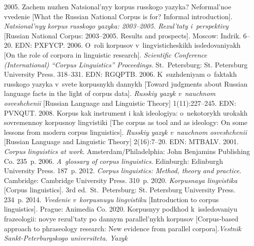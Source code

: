 \begin{multicols}{2}
{\small\frenchspacing
 {%
 \begin{thebibliography}{99} 
 2005. Zachem nuzhen Natsional'nyy kor\-pus russkogo yazyka? 
Neformal'noe vvedenie [What the Russian National Corpus is for? Informal introduction]. 
\textit{Natsional'nyy korpus russkogo yazyka: 2003--2005. Rezul'taty i~perspektivy} [Russian 
National Corpus: 2003--2005. Results and prospects].  Moscow: Indrik. 6--20. EDN: PXFYCP.
 2006. O~roli korpusov v~lingvisticheskikh issledovaniyakh [On the role 
of corpora in linguistic research]. \textit{Scientific Conference (International) ``Corpus Linguistics'' Proceedings}. St.\ 
Petersburg: St. Petersburg University Press. 318--331. EDN: RGQPTB.
\bibitem{3-gon-1}
 2006. K~suzhdeniyam o~faktakh russkogo yazyka v~svete korpusnykh 
dannykh [Toward judgments about Russian language facts in the light of corpus data]. 
\textit{Russkiy yazyk v~nauchnom osveshchenii} [Russian Language and Linguistic Theory] 
1(11):227--245. EDN: PVNQUT.
 2008. Korpus kak instrument i kak ideologiya: o~nekotorykh urokakh 
sovremennoy korpusnoy lingvistiki [The corpus as tool and as ideology: On some lessons from 
modern corpus linguistics]. \textit{Russkiy yazyk v~nauchnom osveshchenii} [Russian Language 
and Linguistic Theory] 2(16):7--20. EDN: MTBALV.
 2001. \textit{Corpus linguistics at work}. Amsterdam/Philadelphia: 
John Benjamins Publishing Co. 235~p.
 2006. \textit{A~glossary of corpus linguistics}. 
Edinburgh: Edinburgh University Press. 187~p.
 2012. \textit{Corpus linguistics: Method, theory and 
practice}. Cambridge: Cambridge University Press. 310~p.
 2020. \textit{Korpusnaya lingvistika} [Corpus linguistics].
3rd ed.\ St.\ Petersburg: 
St. Petersburg University Press. 234~p.
 2014. \textit{Vvedenie v~korpusnuyu lingvistiku} [Introduction to 
corpus linguistics]. Prague: Animedia Co. 
 2020. Korpusnyy podkhod k~issledovaniyu frazeologii: novye 
rezul'taty po dannym parallel'nykh korpusov [Corpus-based approach to phraseology research: 
New evidence from parallel corpora].\linebreak \textit{Vestnik Sankt-Peterburgskogo universiteta. Yazyk 
}
\end{thebibliography}}}
\end{multicols}
